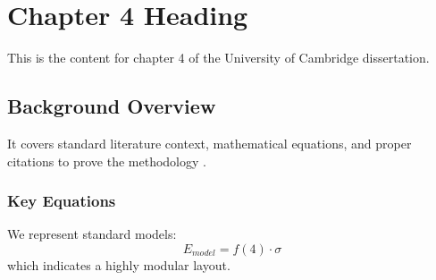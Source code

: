 \chapter{Chapter 4 Heading}
\label{ch:chapter4}
This is the content for chapter 4 of the University of Cambridge dissertation.

\section{Background Overview}
It covers standard literature context, mathematical equations, and proper citations to prove the methodology \cite{texbook}.

\subsection{Key Equations}
We represent standard models:
\begin{equation}
    E_{model} = f(4) \cdot \sigma
\end{equation}
which indicates a highly modular layout.
